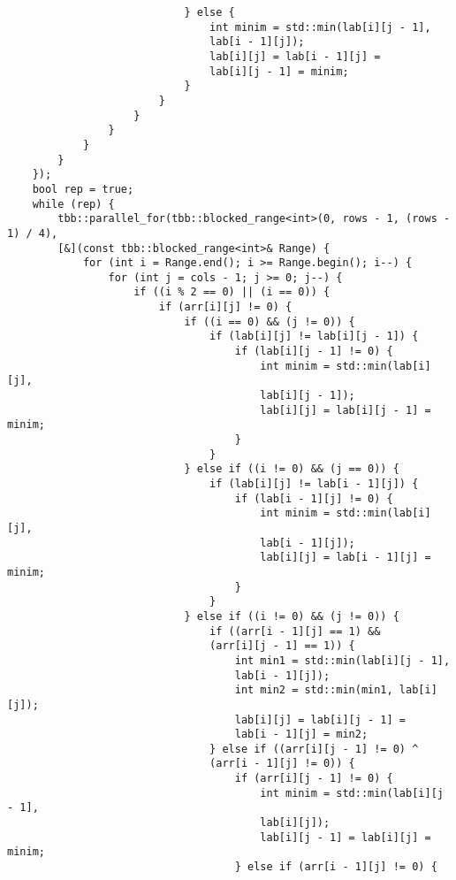 \documentclass{report}
\begin{document}
\begin{lstlisting}
                            } else {
                                int minim = std::min(lab[i][j - 1],
                                lab[i - 1][j]);
                                lab[i][j] = lab[i - 1][j] =
                                lab[i][j - 1] = minim;
                            }
                        }
                    }
                }
            }
        }
    });
    bool rep = true;
    while (rep) {
        tbb::parallel_for(tbb::blocked_range<int>(0, rows - 1, (rows - 1) / 4),
        [&](const tbb::blocked_range<int>& Range) {
            for (int i = Range.end(); i >= Range.begin(); i--) {
                for (int j = cols - 1; j >= 0; j--) {
                    if ((i % 2 == 0) || (i == 0)) {
                        if (arr[i][j] != 0) {
                            if ((i == 0) && (j != 0)) {
                                if (lab[i][j] != lab[i][j - 1]) {
                                    if (lab[i][j - 1] != 0) {
                                        int minim = std::min(lab[i][j],
                                        lab[i][j - 1]);
                                        lab[i][j] = lab[i][j - 1] = minim;
                                    }
                                }
                            } else if ((i != 0) && (j == 0)) {
                                if (lab[i][j] != lab[i - 1][j]) {
                                    if (lab[i - 1][j] != 0) {
                                        int minim = std::min(lab[i][j],
                                        lab[i - 1][j]);
                                        lab[i][j] = lab[i - 1][j] = minim;
                                    }
                                }
                            } else if ((i != 0) && (j != 0)) {
                                if ((arr[i - 1][j] == 1) &&
                                (arr[i][j - 1] == 1)) {
                                    int min1 = std::min(lab[i][j - 1],
                                    lab[i - 1][j]);
                                    int min2 = std::min(min1, lab[i][j]);
                                    lab[i][j] = lab[i][j - 1] =
                                    lab[i - 1][j] = min2;
                                } else if ((arr[i][j - 1] != 0) ^
                                (arr[i - 1][j] != 0)) {
                                    if (arr[i][j - 1] != 0) {
                                        int minim = std::min(lab[i][j - 1],
                                        lab[i][j]);
                                        lab[i][j - 1] = lab[i][j] = minim;
                                    } else if (arr[i - 1][j] != 0) {

\end{lstlisting}
\end{document}
